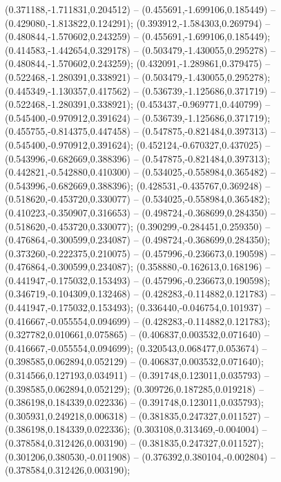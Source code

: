  (0.371188,-1.711831,0.204512) -- (0.455691,-1.699106,0.185449) -- (0.429080,-1.813822,0.124291);
 (0.393912,-1.584303,0.269794) -- (0.480844,-1.570602,0.243259) -- (0.455691,-1.699106,0.185449);
 (0.414583,-1.442654,0.329178) -- (0.503479,-1.430055,0.295278) -- (0.480844,-1.570602,0.243259);
 (0.432091,-1.289861,0.379475) -- (0.522468,-1.280391,0.338921) -- (0.503479,-1.430055,0.295278);
 (0.445349,-1.130357,0.417562) -- (0.536739,-1.125686,0.371719) -- (0.522468,-1.280391,0.338921);
 (0.453437,-0.969771,0.440799) -- (0.545400,-0.970912,0.391624) -- (0.536739,-1.125686,0.371719);
 (0.455755,-0.814375,0.447458) -- (0.547875,-0.821484,0.397313) -- (0.545400,-0.970912,0.391624);
 (0.452124,-0.670327,0.437025) -- (0.543996,-0.682669,0.388396) -- (0.547875,-0.821484,0.397313);
 (0.442821,-0.542880,0.410300) -- (0.534025,-0.558984,0.365482) -- (0.543996,-0.682669,0.388396);
 (0.428531,-0.435767,0.369248) -- (0.518620,-0.453720,0.330077) -- (0.534025,-0.558984,0.365482);
 (0.410223,-0.350907,0.316653) -- (0.498724,-0.368699,0.284350) -- (0.518620,-0.453720,0.330077);
 (0.390299,-0.284451,0.259350) -- (0.476864,-0.300599,0.234087) -- (0.498724,-0.368699,0.284350);
 (0.373260,-0.222375,0.210075) -- (0.457996,-0.236673,0.190598) -- (0.476864,-0.300599,0.234087);
 (0.358880,-0.162613,0.168196) -- (0.441947,-0.175032,0.153493) -- (0.457996,-0.236673,0.190598);
 (0.346719,-0.104309,0.132468) -- (0.428283,-0.114882,0.121783) -- (0.441947,-0.175032,0.153493);
 (0.336440,-0.046754,0.101937) -- (0.416667,-0.055554,0.094699) -- (0.428283,-0.114882,0.121783);
 (0.327782,0.010661,0.075865) -- (0.406837,0.003532,0.071640) -- (0.416667,-0.055554,0.094699);
 (0.320543,0.068477,0.053674) -- (0.398585,0.062894,0.052129) -- (0.406837,0.003532,0.071640);
 (0.314566,0.127193,0.034911) -- (0.391748,0.123011,0.035793) -- (0.398585,0.062894,0.052129);
 (0.309726,0.187285,0.019218) -- (0.386198,0.184339,0.022336) -- (0.391748,0.123011,0.035793);
 (0.305931,0.249218,0.006318) -- (0.381835,0.247327,0.011527) -- (0.386198,0.184339,0.022336);
 (0.303108,0.313469,-0.004004) -- (0.378584,0.312426,0.003190) -- (0.381835,0.247327,0.011527);
 (0.301206,0.380530,-0.011908) -- (0.376392,0.380104,-0.002804) -- (0.378584,0.312426,0.003190);
